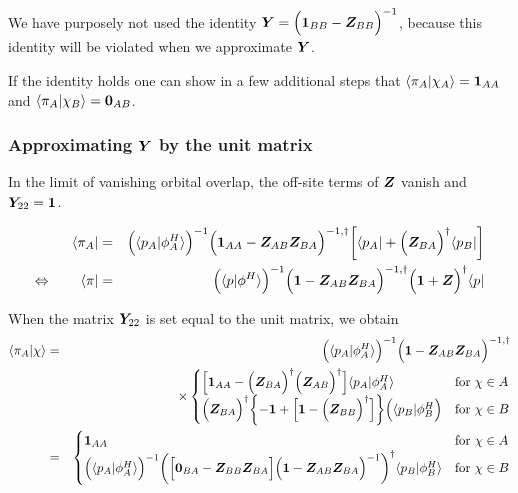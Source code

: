 \documentclass[11pt,a4paper]{report}
\begin{document}
We have purposely not used the identity
$\bm{Y}=\Bigl(\bm{1}_{BB}-\bm{Z}_{BB}\Bigr)^{-1}$, because this
identity will be violated when we approximate $\bm{Y}$.

If the identity holds one can show in a few additional steps that
$\langle\pi_A|\chi_A\rangle=\bm{1}_{AA}$ and
$\langle\pi_A|\chi_B\rangle=\bm{0}_{AB}$.

\subsubsection{Approximating $\bm{Y}$ by the unit matrix}
In the limit of vanishing orbital overlap, the off-site terms of $\bm{Z}$
vanish and $\bm{Y}_{22}=\bm{1}$.

\begin{eqnarray}
\langle\pi_A|&=&
\Bigl(\langle{p}_A|\phi^H_A\rangle\Bigr)^{-1}
\Bigl(\mat{1}_{AA}-\mat{Z}_{AB}\mat{Z}_{BA}
\Bigr)^{-1,\dagger}
\biggl[\langle{p}_A|
+
\Bigl(\mat{Z}_{BA}\Bigr)^\dagger
\langle{p}_B|\biggr]
\nonumber\\
%
%
%
\Leftrightarrow\qquad
\langle\pi|&=&
\Bigl(\langle{p}|\phi^H\rangle\Bigr)^{-1}
\Bigl(\mat{1}-\mat{Z}_{AB}\mat{Z}_{BA}
\Bigr)^{-1,\dagger}
\Bigl(\mat{1}+\mat{Z}\Bigr)^\dagger
\langle{p}|
\end{eqnarray}

When the matrix $\bm{Y}_{22}$ is set equal to the unit matrix,
we obtain
\begin{eqnarray}
\langle\pi_A|\chi\rangle
&=&
\Bigl(\langle{p}_A|\phi^H_A\rangle\Bigr)^{-1}
\Bigl(\mat{1}-\mat{Z}_{AB}\mat{Z}_{BA}\Bigr)^{-1,\dagger}
\nonumber\\
&&\times
\begin{cases}
\Bigl[
\mat{1}_{AA}
-
\Bigl(\mat{Z}_{BA}\Bigr)^\dagger
\Bigl(\mat{Z}_{AB}\Bigr)^\dagger
\Bigr]
\langle{p}_A|\phi^H_A\rangle
&\text{for $\chi\in A$}
\\
\Bigl(\mat{Z}_{BA}\Bigr)^\dagger
\biggl\lbrace
-
\mat{1}
+
\Bigl[\mat{1}
-
\Bigl(\mat{Z}_{BB}\Bigr)^\dagger
\Bigr]
\biggr\rbrace\Bigl(\langle{p}_B|\phi^H_B\Bigr)
&\text{for $\chi\in B$}
\end{cases}
\nonumber\\
%
%
%
&=&
\begin{cases}
\mat{1}_{AA}
&\text{for $\chi\in A$}
\\
\Bigl(\langle{p}_A|\phi^H_A\rangle\Bigr)^{-1}
\biggl(
\Bigl[\mat{0}_{BA}-\mat{Z}_{BB}\mat{Z}_{BA}\Bigr]
\Bigl(\mat{1}-\mat{Z}_{AB}\mat{Z}_{BA}\Bigr)^{-1}
\biggr)^\dagger
\langle{p}_B|\phi^H_B\rangle
&\text{for $\chi\in B$}
\end{cases}
\nonumber\\
\end{eqnarray}
\end{document}

